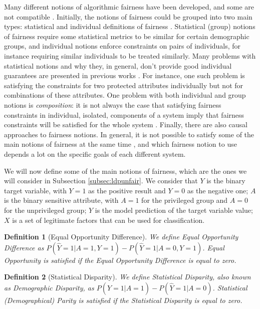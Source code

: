 \documentclass[conference]{IEEEtran}
\newtheorem{definition}{Definition}
\begin{document}
Many different notions of algorithmic fairness have been developed, and some are not compatible \cite{alves2023survey}. Initially, the notions of fairness could be grouped into two main types: statistical and individual definitions of fairness \cite{chouldechova2018frontiers}. Statistical (group) notions of fairness require some statistical metrics to be similar for certain demographic groups, and individual notions enforce constraints on pairs of individuals, for instance requiring similar individuals to be treated similarly. Many problems with statistical notions and why they, in general, don't provide good individual guarantees are presented in previous works \cite{Awareness}\cite{kearns2018preventing}. For instance, one such problem is satisfying the constraints for two protected attributes individually but not for combinations of these attributes. One problem with both individual and group notions is \emph{composition}: it is not always the case that satisfying fairness constraints in individual, isolated, components of a system imply that fairness constraints will be satisfied for the whole system \cite{dwork2018fairness}. Finally, there are also causal approaches to fairness notions. In general, it is not possible to satisfy some of the main notions of fairness at the same time \cite{hellman2020measuring}\cite{bell2023possibility}\cite{zemel2013learning}, and which fairness notion to use depends a lot on the specific goals of each different system.

We will now define some of the main notions of fairness, which are the ones we will consider in Subsection \ref{subsec:ldpunfair}. We consider that $Y$ is the binary target variable, with $Y=1$ as the positive result and $Y=0$ as the negative one; $A$ is the binary sensitive attribute, with $A=1$ for the privileged group and $A=0$ for the unprivileged group; $\hat Y$ is the model prediction of the target variable value; $X$ is a set of legitimate factors that can be used for classification.

\begin{definition}[Equal Opportunity Difference]\label{def:EOD} We define \emph{Equal Opportunity Difference} as $P(\hat Y = 1| A = 1, Y =1) - P(\hat Y = 1| A = 0, Y = 1)$. Equal Opportunity is \emph{satisfied} if the Equal Opportunity Difference is equal to zero.
\end{definition}

\begin{definition}[Statistical Disparity]\label{def:SD} We define \emph{Statistical Disparity}, also known as \emph{Demographic Disparity}, as $P(\hat Y = 1| A = 1) - P(\hat Y = 1| A = 0)$. Statistical (Demographical) \emph{Parity} is \emph{satisfied} if the Statistical Disparity is equal to zero.
\end{definition}
\end{document}
